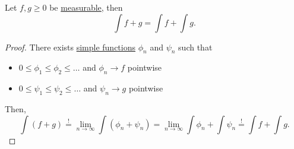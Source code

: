 \begin{corollary}\label{col:linearity-of-nonnegative-integral}
	Let \(f, g \geq 0\) be \hyperref[def:measurable-function]{measurable}, then
	\[
		\int f+g = \int f+\int g.
	\]
\end{corollary}
\begin{proof}
	There exists \hyperref[def:simple-function]{simple functions} \(\phi _{n}\) and \(\psi _{n}\) such that
	\begin{itemize}
		\item \(0\leq \phi _1 \leq \phi _2\leq \ldots  \) and \(\phi _{n}\to f\) pointwise
		\item \(0\leq \psi _1 \leq \psi _2\leq \ldots  \) and \(\psi _{n}\to g\) pointwise
	\end{itemize}

	Then,
	\[
		\int (f+g)\overset{\hyperref[thm:MCT]{!}}{=}\lim\limits_{n \to \infty}\int (\phi _{n} + \psi _{n}) = \lim\limits_{n \to \infty} \int \phi _{n} + \int \psi _{n}\overset{\hyperref[thm:MCT]{!}}{=} \int f + \int g.
	\]
\end{proof}
